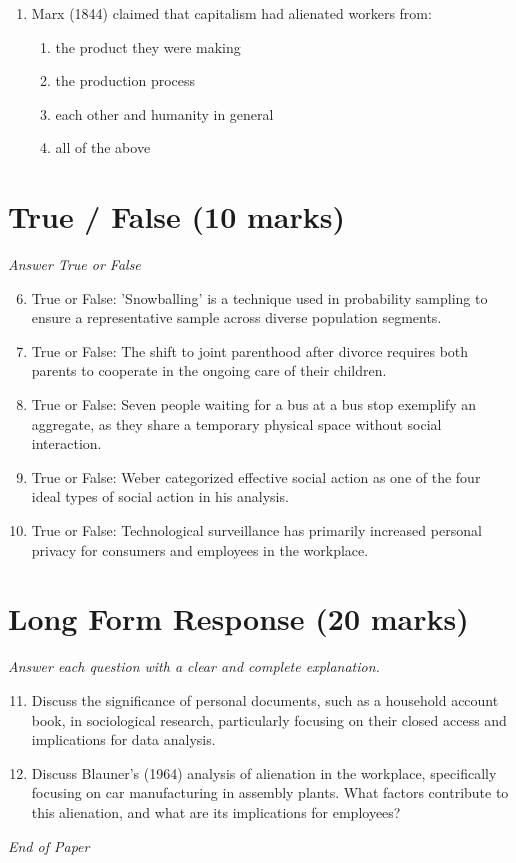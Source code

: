 \documentclass[12pt]{article}
\begin{document}
\begin{enumerate}[label=\arabic*.]
\begin{enumerate}[label=(\alph*)]
    \item common activities involving all-round relationships
    \item a fixed geographical location
    \item collective action based on common interests
\end{enumerate}
\item Marx (1844) claimed that capitalism had alienated workers from:
\begin{enumerate}[label=(\alph*)]
    \item the product they were making
    \item the production process
    \item each other and humanity in general
    \item all of the above
\end{enumerate}
\end{enumerate}

\section*{True / False (10 marks)}
\textit{Answer True or False}
\begin{enumerate}[label=\arabic*.]
\setcounter{enumi}{5}
\item True or False: 'Snowballing' is a technique used in probability sampling to ensure a representative sample across diverse population segments.
\item True or False: The shift to joint parenthood after divorce requires both parents to cooperate in the ongoing care of their children.
\item True or False: Seven people waiting for a bus at a bus stop exemplify an aggregate, as they share a temporary physical space without social interaction.
\item True or False: Weber categorized effective social action as one of the four ideal types of social action in his analysis.
\item True or False: Technological surveillance has primarily increased personal privacy for consumers and employees in the workplace.
\end{enumerate}

\section*{Long Form Response (20 marks)}
\textit{Answer each question with a clear and complete explanation.}
\begin{enumerate}[label=\arabic*.]
\setcounter{enumi}{10}
\item Discuss the significance of personal documents, such as a household account book, in sociological research, particularly focusing on their closed access and implications for data analysis.
\item Discuss Blauner's (1964) analysis of alienation in the workplace, specifically focusing on car manufacturing in assembly plants. What factors contribute to this alienation, and what are its implications for employees?
\end{enumerate}

\vfill
\noindent\textit{End of Paper}
\end{document}
